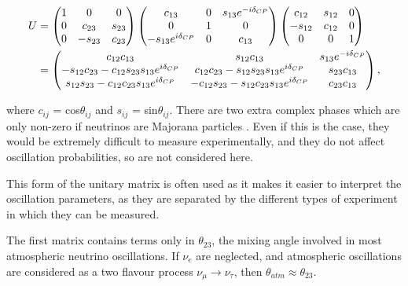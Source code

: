 \begin{equation}
\begin{aligned}
U & =
\begin{pmatrix}
1 & 0 & 0\\
0 & c_{23} & s_{23}\\
0 & -s_{23} & c_{23}\\
\end{pmatrix}
\begin{pmatrix}
c_{13} & 0 & s_{13}e^{-i\delta_{CP}}\\
0 & 1 & 0\\
-s_{13}e^{i\delta_{CP}} & 0 & c_{13}\\
\end{pmatrix}
\begin{pmatrix}
c_{12} & s_{12} & 0\\
-s_{12} & c_{12} & 0\\
0 & 0 & 1\\
\end{pmatrix}
\\& =
\begin{pmatrix}
c_{12}c_{13} & s_{12}c_{13} & s_{13}e^{-i\delta_{CP}}\\
-s_{12}c_{23} - c_{12}s_{23}s_{13}e^{i\delta_{CP}} & c_{12}c_{23}-s_{12}s_{23}s_{13}e^{i\delta_{CP}} & s_{23}c_{13} \\
s_{12}s_{23} - c_{12}c_{23}s_{13}e^{i\delta_{CP}} & -c_{12}s_{23} - s_{12}c_{23}s_{13}e^{i\delta_{CP}} & c_{23}c_{13} \\
\end{pmatrix},
\end{aligned}
\vspace{10pt}
\end{equation}

where $c_{ij}$ = cos$\theta_{ij}$ and $s_{ij}$ = sin$\theta_{ij}$. There are two extra complex phases which are only non-zero if neutrinos are Majorana particles \cite{majorana}. Even if this is the case, they would be extremely difficult to measure experimentally, and they do not affect oscillation probabilities, so are not considered here.

This form of the unitary matrix is often used as it makes it easier to interpret the oscillation parameters, as they are separated by the different types of experiment in which they can be measured. 

The first matrix contains terms only in $\theta_{23}$, the mixing angle involved in most atmospheric neutrino oscillations. If $\nu_e$ are neglected, and atmospheric oscillations are considered as a two flavour process $\nu_\mu \rightarrow \nu_\tau$, then $\theta_{atm} \approx \theta_{23}$.

